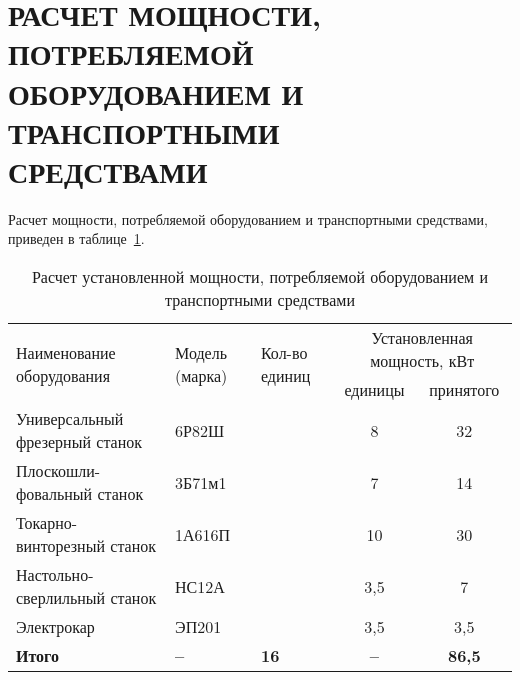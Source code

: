 \section[%
Расчет мощности, потребляемой оборудованием и транспортными \\
средствами]{%
  РАСЧЕТ МОЩНОСТИ, ПОТРЕБЛЯЕМОЙ \\
  ОБОРУДОВАНИЕМ И  ТРАНСПОРТНЫМИ \\ 
  СРЕДСТВАМИ
}
\label{sec:placement}

Расчет мощности, потребляемой оборудованием и транспортными средствами, 
приведен в таблице~\ref{tbl:tech_power}.

\begin{table} [h!]
  \caption{
    Расчет установленной мощности, потребляемой
    оборудованием и транспортными средствами 
  }\label{tbl:tech_power}
    \begin{tabular}{| m{4cm} | m{2cm} | m{2cm} | c | c |}
      \hline
      \multirow{2}{*}{\parbox{4cm}{
          \smallskip
          \centering Наименование оборудования
          \smallskip
        }
      }
      & \multirow{2}{*}{\parbox{2cm}{
            \smallskip
            \centering Модель (марка)
            \smallskip
          } 
        }
      & \multirow{2}{*}{\parbox{2cm}{
            \smallskip
            \centering Кол-во единиц
            \smallskip
          }
        }
      & \multicolumn{2}{c|}{Установленная мощность, кВт} \\ \cline{4-5}

      & & 
      & \parbox{3cm}{\centering единицы} 
      & \parbox{3cm}{\centering принятого} \\
      \hline

      Универсальный фрезерный станок & \centering 6Р82Ш 
      &  & 8 & 32 \\
      \hline

      Плоскошли- фовальный станок & \centering 3Б71м1 
      &  & 7 & 14 \\
      \hline

      Токарно-винторезный станок & \centering 1А616П 
      &  & 10 & 30 \\
      \hline

      Настольно-сверлильный станок & \centering НС12А 
      &  & 3{,}5 & 7 \\
      \hline

      Электрокар & \centering ЭП201 
      &  & 3{,}5 & 3{,}5 \\
      \hline

      \raggedleft \textbf{Итого} & \centering \textbf{--} 
      & \centering \textbf{16} & \textbf{--} & \textbf{86{,}5} \\
      \hline
    \end{tabular}
\end{table}
